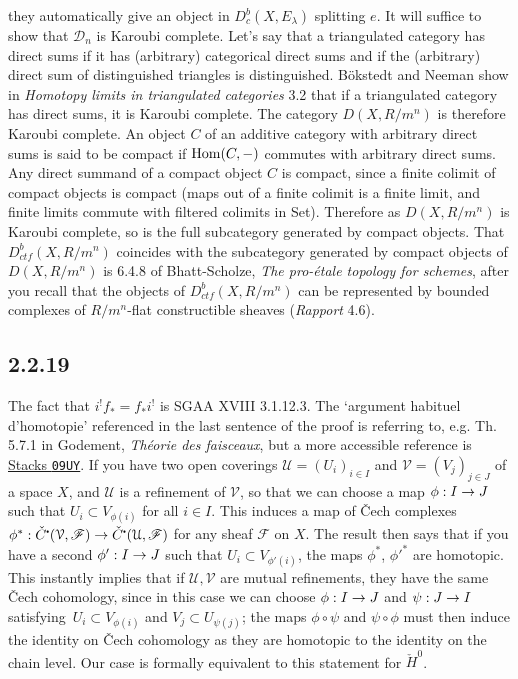 \documentclass[deligne.tex]{subfiles}
\begin{document}
they automatically give an object in $D_c^b(X,E_\lambda)$ splitting $e$.
It will suffice to show that $\mathcal D_n$ is Karoubi complete.
Let's say that a triangulated category has direct sums if it has
(arbitrary) categorical direct sums and if the (arbitrary) direct sum of
distinguished triangles is distinguished.
B\"okstedt and Neeman show in \emph{Homotopy limits in triangulated categories} 3.2
that if a triangulated category has direct sums, it is Karoubi complete.
The category $D(X,R/m^n)$ is therefore Karoubi complete.
An object $C$ of an additive category with arbitrary direct sums is said to
be compact if $\operatorname{Hom}(C,-)$ commutes with arbitrary direct sums.
Any direct summand of a compact object $C$ is compact, since a finite
colimit of compact objects is compact
(maps out of a finite colimit is a finite limit, and finite limits commute
with filtered colimits in Set). Therefore as $D(X,R/m^n)$ is Karoubi complete, so
is the full subcategory generated by compact objects.
That $D_{ctf}^b(X,R/m^n)$ coincides with the subcategory generated by
compact objects of $D(X,R/m^n)$ is 6.4.8 of Bhatt-Scholze,
\emph{The pro-étale topology for schemes}, after you recall that the
objects of $D^b_{ctf}(X,R/m^n)$ can be represented by bounded complexes
of $R/m^n$-flat constructible sheaves (\emph{Rapport} 4.6).

\subsection*{2.2.19} The fact that $i^!f_*=f_*i^!$ is SGAA XVIII 3.1.12.3.
The `argument habituel d'homotopie' referenced in the last sentence of the
proof is referring to, e.g. Th. 5.7.1 in Godement,
\emph{Théorie des faisceaux}, but a more accessible reference is
\href{https://stacks.math.columbia.edu/tag/09UY}{Stacks \texttt{09UY}}.
If you have two open coverings $\mathcal U=(U_i)_{i\in I}$ and
$\mathcal V=(V_j)_{j\in J}$ of a space $X$, and $\mathcal U$ is a refinement
of $\mathcal V$, so that we can choose a map $\phi:I\rightarrow J$ such that
$U_i\subset V_{\phi(i)}$ for all $i\in I$. This induces a map of \v Cech
complexes
$\phi^*:\check C^\dotp(\mathcal V,\mathscr F)\ra\check C^\dotp(\mathcal U,\mathscr F)$
for any sheaf $\mathscr F$ on $X$.
The result then says that if you have a second $\phi':I\rightarrow J$ such that
$U_i\subset V_{\phi'(i)}$, the maps $\phi^*$, $\phi'^*$ are homotopic.
This instantly implies that if $\mathcal U,\mathcal V$ are mutual 
refinements, they have the same \v Cech cohomology, since in this case we
can choose $\phi:I\rightarrow J$ and $\psi:J\rightarrow I$ satisfying\
$U_i\subset V_{\phi(i)}$ and $V_j\subset U_{\psi(j)}$; the maps
$\phi\circ\psi$ and $\psi\circ\phi$ must then induce the identity on
\v Cech cohomology as they are homotopic to the identity on the chain level.
Our case is formally equivalent to this statement for $\check H^0$.
\end{document}
